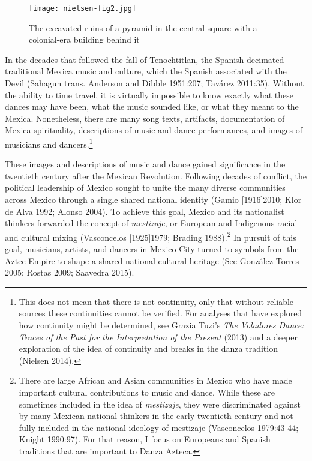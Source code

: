 \documentclass[twoside]{article}
\begin{document}
\begin{figure}
  \texttt{[image: nielsen-fig2.jpg]}
  \caption{The excavated ruins of a pyramid in the central square with a colonial-era building behind it}
\end{figure}

In the decades that followed the fall of Tenochtitlan, the Spanish
decimated traditional Mexica music and culture, which the Spanish
associated with the Devil (Sahagun trans. Anderson and Dibble 1951:207;
Tavárez 2011:35). Without the ability to time travel, it is virtually
impossible to know exactly what these dances may have been, what the
music sounded like, or what they meant to the Mexica. Nonetheless, there
are many song texts, artifacts, documentation of Mexica spirituality,
descriptions of music and dance performances, and images of musicians
and dancers.\footnote{This does not mean that there is not continuity,
  only that without reliable sources these continuities cannot be
  verified. For analyses that have explored how continuity might be
  determined, see Grazia Tuzi's \emph{The Voladores Dance: Traces of the
  Past for the Interpretation of the Present} (2013) and a deeper
  exploration of the idea of continuity and breaks in the danza
  tradition (Nielsen 2014).}

These images and descriptions of music and dance gained significance in
the twentieth century after the Mexican Revolution. Following decades of
conflict, the political leadership of Mexico sought to unite the many
diverse communities across Mexico through a single shared national
identity (Gamio {[}1916{]}2010; Klor de Alva 1992; Alonso 2004). To
achieve this goal, Mexico and its nationalist thinkers forwarded the
concept of \emph{mestizaje}, or European and Indigenous racial and
cultural mixing (Vasconcelos {[}1925{]}1979; Brading 1988).\footnote{There
  are large African and Asian communities in Mexico who have made
  important cultural contributions to music and dance. While these are
  sometimes included in the idea of \emph{mestizaje}, they were
  discriminated against by many Mexican national thinkers in the early
  twentieth century and not fully included in the national ideology of
  mestizaje (Vasconcelos 1979:43-44; Knight 1990:97). For that reason, I
  focus on Europeans and Spanish traditions that are important to Danza
  Azteca.} In pursuit of this goal, musicians, artists, and dancers in
Mexico City turned to symbols from the Aztec Empire to shape a shared
national cultural heritage (See González Torres 2005; Rostas 2009;
Saavedra 2015).
\end{document}
